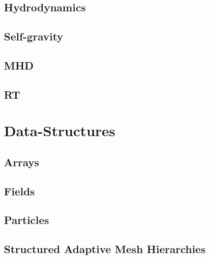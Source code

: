 \documentclass{book}
\begin{document}
\subsection{Hydrodynamics}

\subsection{Self-gravity}

\subsection{MHD}

\subsection{RT}

\section{Data-Structures}

\subsection{Arrays}

\subsection{Fields}

\subsection{Particles}

\subsection{Structured Adaptive Mesh Hierarchies}
\end{document}
